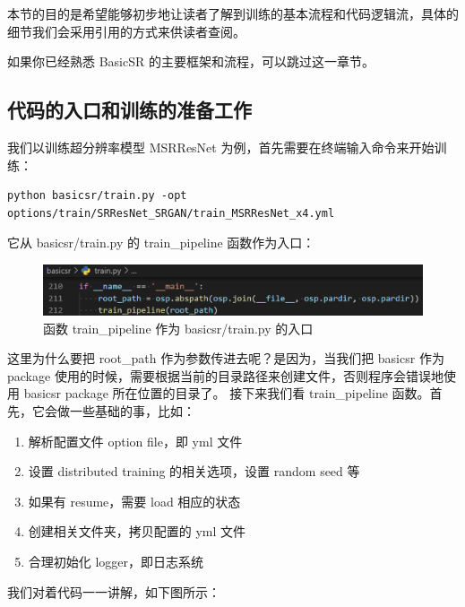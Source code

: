 \documentclass[../main.tex]{subfiles}
\begin{document}
本节的目的是希望能够初步地让读者了解到训练的基本流程和代码逻辑流，具体的细节我们会采用引用的方式来供读者查阅。

如果你已经熟悉 BasicSR 的主要框架和流程，可以跳过这一章节。

\subsection{代码的入口和训练的准备工作}
我们以训练超分辨率模型 MSRResNet 为例，首先需要在终端输入命令来开始训练：
    
\begin{verbatim}
python basicsr/train.py -opt options/train/SRResNet_SRGAN/train_MSRResNet_x4.yml
\end{verbatim}

它从 basicsr/train.py 的 train\_pipeline 函数作为入口：

\begin{figure}[H]

\begin{center}

    \includegraphics[width=0.7\linewidth]{figures/getting_start_1.png}
    \caption{函数 train\_pipeline 作为 basicsr/train.py 的入口}
    \label{fig:getting_start_1}
\end{center}
\vspace{-0.5cm}
\end{figure}

这里为什么要把 root\_path 作为参数传进去呢？是因为，当我们把 basicsr 作为 package 使用的时候，需要根据当前的目录路径来创建文件，否则程序会错误地使用 basicsr package 所在位置的目录了。
接下来我们看 train\_pipeline 函数。首先，它会做一些基础的事，比如：
\begin{enumerate}

\item 解析配置文件 option file，即 yml 文件
\item 设置 distributed training 的相关选项，设置 random seed 等
\item 如果有 resume，需要 load 相应的状态
\item 创建相关文件夹，拷贝配置的 yml 文件
\item 合理初始化 logger，即日志系统
\end{enumerate}

我们对着代码一一讲解，如下图所示：
\end{document}

